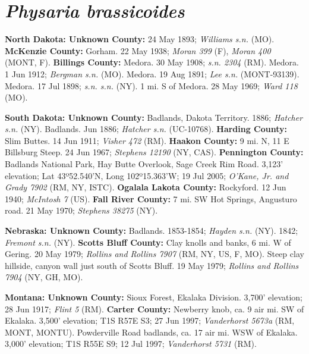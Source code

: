 \section*{\textit{Physaria brassicoides}}

  \textbf{North Dakota: Unknown County:}
24 May 1893; \textit{Williams s.n.} (MO). 
  \textbf{McKenzie County:} 
Gorham. 22 May 1938; \textit{Moran 399} (F), \textit{Moran 400} (MONT, F).  
  \textbf{Billings County:}
Medora. 30 May 1908; \textit{s.n. 2304} (RM).
Medora. 1 Jun 1912; \textit{Bergman s.n.} (MO).
Medora. 19 Aug 1891; \textit{Lee s.n.} (MONT-93139).
Medora. 17 Jul 1898; \textit{s.n. s.n.} (NY).
1 mi. S of Medora. 28 May 1969; \textit{Ward 118} (MO).

  \textbf{South Dakota: Unknown County:}
Badlands, Dakota Territory. 1886; \textit{Hatcher s.n.} (NY).
Badlands. Jun 1886; \textit{Hatcher s.n.} (UC-10768).
  \textbf{Harding County:}
Slim Buttes. 14 Jun 1911; \textit{Visher 472} (RM).
  \textbf{Haakon County:}
9 mi. N, 11 E Billsburg Steep. 24 Jun 1967; \textit{Stephens 12190} (NY, CAS).
  \textbf{Pennington County:}
Badlands National Park, Hay Butte Overlook, Sage Creek Rim Road. 3,123' elevation; Lat 43º52.540'N, Long 102º15.363'W; 19 Jul 2005; \textit{O'Kane, Jr. and Grady 7902} (RM, NY, ISTC).
  \textbf{Ogalala Lakota County:}
Rockyford. 12 Jun 1940; \textit{McIntosh 7} (US).
  \textbf{Fall River County:}
7 mi. SW Hot Springs, Angusturo road. 21 May 1970; \textit{Stephens 38275} (NY).

  \textbf{Nebraska: Unknown County:}
Badlands. 1853-1854; \textit{Hayden s.n.} (NY).
1842; \textit{Fremont s.n.} (NY).
  \textbf{Scotts Bluff County:}
Clay knolls and banks, 6 mi. W of Gering. 20 May 1979; \textit{Rollins and Rollins 7907} (RM, NY, US, F, MO).
Steep clay hillside, canyon wall just south of Scotts Bluff. 19 May 1979; \textit{Rollins and Rollins 7904} (NY, GH, MO).

  \textbf{Montana: Unknown County:}
Sioux Forest, Ekalaka Division. 3,700' elevation; 28 Jun 1917; \textit{Flint 5} (RM).
  \textbf{Carter County:}
Newberry knob, ca. 9 air mi. SW of Ekalaka. 3,500' elevation; T1S R57E S3; 27 Jun 1997; \textit{Vanderhorst 5673a} (RM, MONT, MONTU).
Powderville Road badlands, ca. 17 air mi. WSW of Ekalaka. 3,000' elevation; T1S R55E S9; 12 Jul 1997; \textit{Vanderhorst 5731} (RM).


